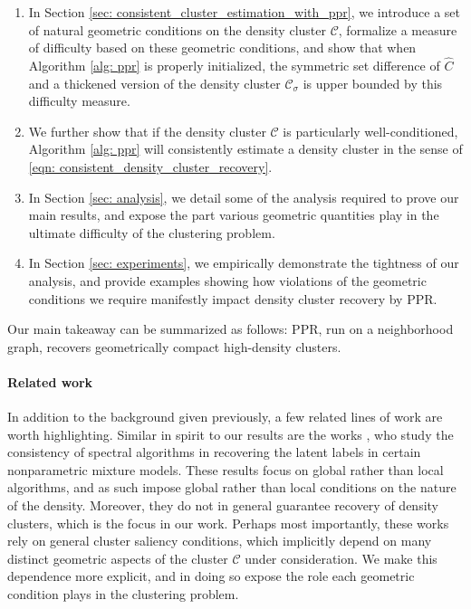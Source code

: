 \documentclass{article}
\newcommand{\1}{\mathbf{1}}
\newcommand{\Cset}{\mathcal{C}}
\newcommand{\Csig}{\Cset_{\sigma}}
\newcommand{\ppr}{{\sc PPR}}
\theoremstyle{aldenthm}
\theoremstyle{aldenrmrk}
\begin{document}
\begin{enumerate}
	\item In Section \ref{sec: consistent_cluster_estimation_with_ppr}, we introduce a set of natural geometric conditions on the density cluster $\Cset$, formalize a measure of difficulty based on these geometric conditions, and show that when Algorithm \ref{alg: ppr} is properly initialized, the symmetric set difference of $\widehat{C}$ and a thickened version of the density cluster $\Csig$ is upper bounded by this difficulty measure.
	
	\item We further show that if the density cluster $\Cset$ is particularly well-conditioned, Algorithm \ref{alg: ppr} will consistently estimate a density cluster in the sense of \eqref{eqn: consistent_density_cluster_recovery}.
	
	\item In Section \ref{sec: analysis}, we detail some of the analysis required to prove our main results, and expose the part various geometric quantities play in the ultimate difficulty of the clustering problem.
	
	\item In Section \ref{sec: experiments}, we empirically
	demonstrate the tightness of our analysis, and provide examples showing how violations of the geometric conditions we require manifestly
	impact density cluster recovery by \ppr.  
\end{enumerate}

Our main takeaway can be summarized as follows: \ppr, run on a neighborhood graph, recovers geometrically compact high-density clusters.

\paragraph{Related work}

In addition to the background given previously, a few related lines of work are worth
highlighting. Similar in spirit to our results are the works
\citep{shi2009,schiebinger2015}, who study the consistency of
spectral algorithms in recovering the latent labels in certain
nonparametric mixture models. These results focus on global rather than local
algorithms, and as such impose global rather than local conditions on the nature
of the density. Moreover, they do not in general guarantee recovery of density
clusters, which is the focus in our work. Perhaps most importantly, these works rely on general cluster saliency conditions, which implicitly depend on many distinct geometric aspects of the cluster $\Cset$ under consideration. We make this dependence more explicit, and in doing so expose the role each geometric condition plays in the clustering problem.
\end{document}
